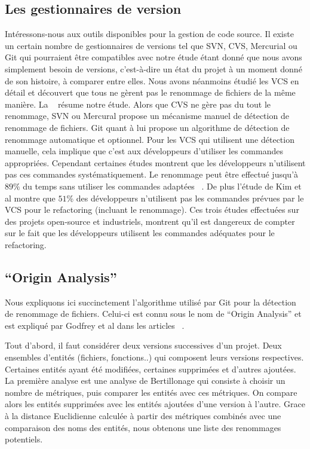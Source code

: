 \subsection{Les gestionnaires de version}

Intéressons-nous aux outils disponibles pour la gestion de code source. Il existe un certain nombre de gestionnaires de versions tel que SVN, CVS, Mercurial ou Git qui pourraient être compatibles avec notre étude étant donné que nous avons simplement besoin de versions, c'est-à-dire un état du projet à un moment donné de son histoire, à comparer entre elles. Nous avons néanmoins étudié les VCS en détail et découvert que tous ne gèrent pas le renommage de fichiers de la même manière. La ~ résume notre étude. Alors que CVS ne gère pas du tout le renommage, SVN ou Mercural propose un mécanisme manuel de détection de renommage de fichiers. Git quant à lui propose un algorithme de détection de renommage automatique et optionnel. Pour les VCS qui utilisent une détection manuelle, cela implique que c'est aux développeurs d'utiliser les commandes appropriées. Cependant certaines études montrent que les développeurs n'utilisent pas ces commandes systématiquement. Le renommage peut être effectué jusqu'à $89\%$ du temps sans utiliser les commandes adaptées ~\cite{lavoie_inferring_2012,steidl_incremental_2014}. De plus l'étude de Kim et al montre que $51$\% des développeurs n'utilisent pas les commandes prévues par le VCS pour le refactoring (incluant le renommage). Ces trois études effectuées sur des projets open-source et industriels, montrent qu'il est dangereux de compter sur le fait que les développeurs utilisent les commandes adéquates pour le refactoring.\\

\subsection{``Origin Analysis''}
Nous expliquons ici succinctement l'algorithme utilisé par Git pour la détection de renommage de fichiers. Celui-ci est connu sous le nom de ``Origin Analysis'' et est expliqué par Godfrey et al dans les articles ~\cite{tu_integrated_2002,godfrey_tracking_2002,godfrey_using_2005}.

Tout d'abord, il faut considérer deux versions successives d'un projet. Deux ensembles d'entités (fichiers, fonctions..) qui composent leurs versions respectives. Certaines entités ayant été modifiées, certaines supprimées et d'autres ajoutées.
La première analyse est une analyse de Bertillonage qui consiste à choisir un nombre de métriques, puis comparer les entités avec ces métriques. On compare alors les entités supprimées avec les entités ajoutées d'une version à l'autre. Grace à la distance Euclidienne calculée à partir des métriques combinés avec une comparaison des noms des entités, nous obtenons une liste des renommages potentiels.


